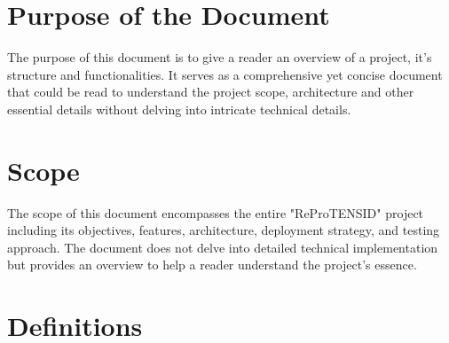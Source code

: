 \documentclass{report}
\begin{document}
\section{Purpose of the Document}
The purpose of this document is to give a reader an overview of a project, it's structure and functionalities. It serves as a comprehensive yet concise document that could be read to understand the project scope, architecture and other essential details without delving into intricate technical details.

\section{Scope}
The scope of this document encompasses the entire "ReProTENSID" project including its objectives, features, architecture, deployment strategy, and testing approach. The document does not delve into detailed technical implementation but provides an overview to help a reader understand the project's essence.

\section{Definitions}
\end{document}
